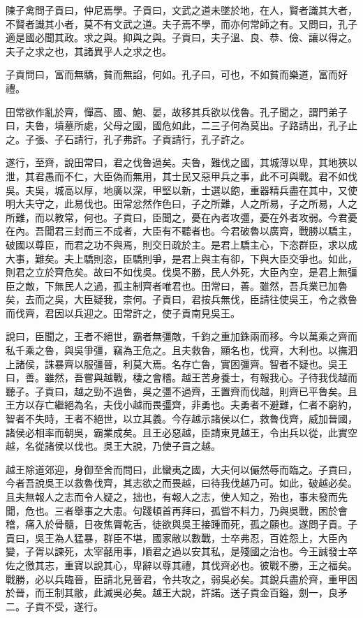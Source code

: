 陳子禽問子貢曰，仲尼焉學。子貢曰，文武之道未墜於地，在人，賢者識其大者，不賢者識其小者，莫不有文武之道。夫子焉不學，而亦何常師之有。又問曰，孔子適是國必聞其政。求之與。抑與之與。子貢曰，夫子溫、良、恭、儉、讓以得之。夫子之求之也，其諸異乎人之求之也。

子貢問曰，富而無驕，貧而無諂，何如。孔子曰，可也，不如貧而樂道，富而好禮。

田常欲作亂於齊，憚高、國、鮑、晏，故移其兵欲以伐魯。孔子聞之，謂門弟子曰，夫魯，墳墓所處，父母之國，國危如此，二三子何為莫出。子路請出，孔子止之。子張、子石請行，孔子弗許。子貢請行，孔子許之。

遂行，至齊，說田常曰，君之伐魯過矣。夫魯，難伐之國，其城薄以卑，其地狹以泄，其君愚而不仁，大臣偽而無用，其士民又惡甲兵之事，此不可與戰。君不如伐吳。夫吳，城高以厚，地廣以深，甲堅以新，士選以飽，重器精兵盡在其中，又使明大夫守之，此易伐也。田常忿然作色曰，子之所難，人之所易，子之所易，人之所難，而以教常，何也。子貢曰，臣聞之，憂在內者攻彊，憂在外者攻弱。今君憂在內。吾聞君三封而三不成者，大臣有不聽者也。今君破魯以廣齊，戰勝以驕主，破國以尊臣，而君之功不與焉，則交日疏於主。是君上驕主心，下恣群臣，求以成大事，難矣。夫上驕則恣，臣驕則爭，是君上與主有卻，下與大臣交爭也。如此，則君之立於齊危矣。故曰不如伐吳。伐吳不勝，民人外死，大臣內空，是君上無彊臣之敵，下無民人之過，孤主制齊者唯君也。田常曰，善。雖然，吾兵業已加魯矣，去而之吳，大臣疑我，柰何。子貢曰，君按兵無伐，臣請往使吳王，令之救魯而伐齊，君因以兵迎之。田常許之，使子貢南見吳王。

說曰，臣聞之，王者不絕世，霸者無彊敵，千鈞之重加銖兩而移。今以萬乘之齊而私千乘之魯，與吳爭彊，竊為王危之。且夫救魯，顯名也，伐齊，大利也。以撫泗上諸侯，誅暴齊以服彊晉，利莫大焉。名存亡魯，實困彊齊。智者不疑也。吳王曰，善。雖然，吾嘗與越戰，棲之會稽。越王苦身養士，有報我心。子待我伐越而聽子。子貢曰，越之勁不過魯，吳之彊不過齊，王置齊而伐越，則齊已平魯矣。且王方以存亡繼絕為名，夫伐小越而畏彊齊，非勇也。夫勇者不避難，仁者不窮約，智者不失時，王者不絕世，以立其義。今存越示諸侯以仁，救魯伐齊，威加晉國，諸侯必相率而朝吳，霸業成矣。且王必惡越，臣請東見越王，令出兵以從，此實空越，名從諸侯以伐也。吳王大說，乃使子貢之越。

越王除道郊迎，身御至舍而問曰，此蠻夷之國，大夫何以儼然辱而臨之。子貢曰，今者吾說吳王以救魯伐齊，其志欲之而畏越，曰待我伐越乃可。如此，破越必矣。且夫無報人之志而令人疑之，拙也，有報人之志，使人知之，殆也，事未發而先聞，危也。三者舉事之大患。句踐頓首再拜曰，孤嘗不料力，乃與吳戰，困於會稽，痛入於骨髓，日夜焦脣乾舌，徒欲與吳王接踵而死，孤之願也。遂問子貢。子貢曰，吳王為人猛暴，群臣不堪，國家敝以數戰，士卒弗忍，百姓怨上，大臣內變，子胥以諫死，太宰嚭用事，順君之過以安其私，是殘國之治也。今王誠發士卒佐之徼其志，重寶以說其心，卑辭以尊其禮，其伐齊必也。彼戰不勝，王之福矣。戰勝，必以兵臨晉，臣請北見晉君，令共攻之，弱吳必矣。其銳兵盡於齊，重甲困於晉，而王制其敝，此滅吳必矣。越王大說，許諾。送子貢金百鎰，劍一，良矛二。子貢不受，遂行。

